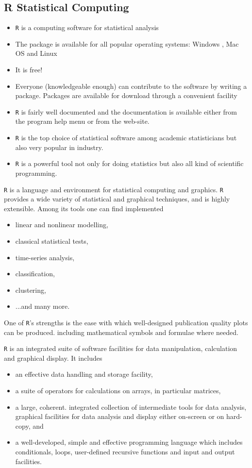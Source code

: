 \documentclass[]{report}
\begin{document}
		{
			\subsection{R Statistical Computing}
			\begin{itemize} \item
				\texttt{R} is a computing software for statistical analysis \item The package is available for all popular operating systems: Windows , Mac OS and Linux
				\item It is free!
				\item Everyone (knowledgeable enough) can contribute to the software by
				writing a package. Packages are available for download through a convenient facility
				\item \texttt{R} is fairly well documented and the documentation is available either
				from the program help menu or from the web-site.
				\item \texttt{R} is the top choice of statistical software among academic statisticians
				but also very popular in industry.
				\item \texttt{R} is a powerful tool not only for doing statistics but also all kind of
				scientific programming.
			\end{itemize}

			\texttt{R} is a language and environment for statistical computing and graphics.
			\texttt{R} provides a wide variety of statistical and graphical techniques, and is highly extensible. Among its tools
			one can find implemented
			\begin{itemize}
				\item linear and nonlinear modelling,
				\item classical statistical tests,
				\item time-series analysis,
				\item classification,
				\item clustering,
				\item ...and many more.
			\end{itemize}
			One of \texttt{R}'s strengths is the ease with which well-designed publication quality plots can be produced.
			including mathematical symbols and formulae where needed.

			
			\texttt{R} is an integrated suite of software facilities for data manipulation, calculation and graphical display. It
			includes
			\begin{itemize}
				\item an effective data handling and storage facility,
				\item a suite of operators for calculations on arrays, in particular matrices,
				\item a large, coherent. integrated collection of intermediate tools for data analysis,
				graphical facilities for data analysis and display either on-screen or on hard-copy, and
				\item a well-developed, simple and effective programming language which includes conditionals, loops,
				user-defined recursive functions and input and output facilities.
			\end{itemize}
		}
\end{document}
